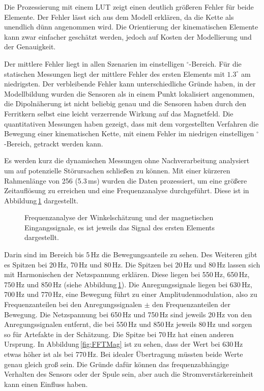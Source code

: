 Die Prozessierung mit einem LUT zeigt einen deutlich größeren Fehler für beide Elemente. Der Fehler lässt sich aus dem Modell erklären, da die Kette als unendlich dünn angenommen wird. Die Orientierung der kinematischen Elemente kann zwar einfacher geschätzt werden, jedoch auf Kosten der Modellierung und der Genauigkeit.

Der mittlere Fehler liegt in allen Szenarien im einstelligen $^\circ$-Bereich. Für die statischen Messungen liegt der mittlere Fehler des ersten Elements mit $1.3^\circ$ am niedrigsten. Der verbleibende Fehler kann unterschiedliche Gründe haben, in der Modellbildung wurden die Sensoren als in einem Punkt lokalisiert angenommen, die Dipolnäherung ist nicht beliebig genau und die Sensoren haben durch den Ferritkern selbst eine leicht verzerrende Wirkung auf das Magnetfeld. Die quantitativen Messungen haben gezeigt, dass mit dem vorgestellten Verfahren die Bewegung einer kinematischen Kette, mit einem Fehler im niedrigen einstelligen $^\circ$-Bereich, getrackt werden kann.

Es werden kurz die dynamischen Messungen ohne Nachverarbeitung analysiert um auf potenzielle Störursachen schließen zu können. Mit einer kürzeren Rahmenlänge von 256 (5.3\,ms) wurden die Daten prozessiert, um eine größere Zeitauflösung zu erreichen und eine Frequenzanalyse durchgeführt. Diese ist in Abbildung\,\ref{fig:FFTAngles} dargestellt. 

\begin{figure}[h]
  \centering
  \caption{Frequenzanalyse der Winkelschätzung und der magnetischen Eingangssignale, es ist jeweils das Signal des ersten Elements dargestellt.}
  \label{fig:FFTAngles}
\end{figure}

Darin sind im Bereich bis 5\,Hz die Bewegungsanteile zu sehen. Des Weiteren gibt es Spitzen bei 20\,Hz, 70\,Hz und 80\,Hz. Die Spitzen bei 20\,Hz und 80\,Hz lassen sich mit Harmonischen der Netzspannung erklären. Diese liegen bei 550\,Hz, 650\,Hz, 750\,Hz und 850\,Hz (siehe Abbildung\,\ref{fig:FFTAngles}). Die Anregungssignale liegen bei 630\,Hz,  700\,Hz und 770\,Hz, eine Bewegung führt zu einer Amplitudenmodulation, also zu Frequenzanteilen bei den Anregungssignalen $\pm$ den Frequenzanteilen der Bewegung. Die Netzspannung bei 650\,Hz und 750\,Hz sind jeweils 20\,Hz von den Anregungssignalen entfernt, die bei 550\,Hz und 850\,Hz jeweils 80\,Hz und sorgen so für Artefakte in der Schätzung. Die Spitze bei 70\,Hz hat einen anderen Ursprung. In Abbildung\,\ref{fig:FFTMag} ist zu sehen, dass der Wert bei 630\,Hz etwas höher ist als bei 770\,Hz. Bei idealer Übertragung müssten beide Werte genau gleich groß sein. Die Gründe dafür können das frequenzabhängige Verhalten des Sensors oder der Spule sein, aber auch die Stromverstärkereinheit kann einen Einfluss haben.

